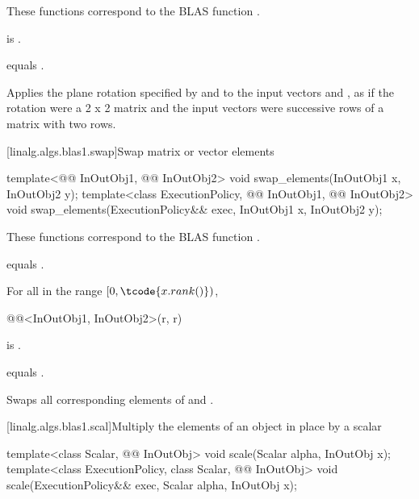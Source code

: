 \begin{itemdescr}
\pnum
\begin{note}
These functions correspond to the BLAS function \supercite{blas1}.
\end{note}

\pnum
\mandates
{} is .

\pnum
\expects
{} equals .

\pnum
\effects
Applies the plane rotation
specified by  and  to
the input vectors  and ,
as if the rotation were a 2 x 2 matrix and
the input vectors were successive rows of a matrix with two rows.
\end{itemdescr}

[linalg.algs.blas1.swap]{Swap matrix or vector elements}

\begin{itemdecl}
template<@@ InOutObj1, @@ InOutObj2>
  void swap_elements(InOutObj1 x, InOutObj2 y);
template<class ExecutionPolicy, @@ InOutObj1, @@ InOutObj2>
  void swap_elements(ExecutionPolicy&& exec, InOutObj1 x, InOutObj2 y);
\end{itemdecl}

\begin{itemdescr}
\pnum
\begin{note}
These functions correspond to the BLAS function \supercite{blas1}.
\end{note}

\pnum
\constraints
{} equals .

\pnum
\mandates
For all  in the range $[0, \tcode{x.rank()})$,
\begin{codeblock}
@@<InOutObj1, InOutObj2>(r, r)
\end{codeblock}
is .

\pnum
\expects
{} equals .

\pnum
\effects
Swaps all corresponding elements of  and .
\end{itemdescr}

[linalg.algs.blas1.scal]{Multiply the elements of an object in place by a scalar}

\begin{itemdecl}
template<class Scalar, @@ InOutObj>
  void scale(Scalar alpha, InOutObj x);
template<class ExecutionPolicy, class Scalar, @@ InOutObj>
  void scale(ExecutionPolicy&& exec, Scalar alpha, InOutObj x);
\end{itemdecl}

